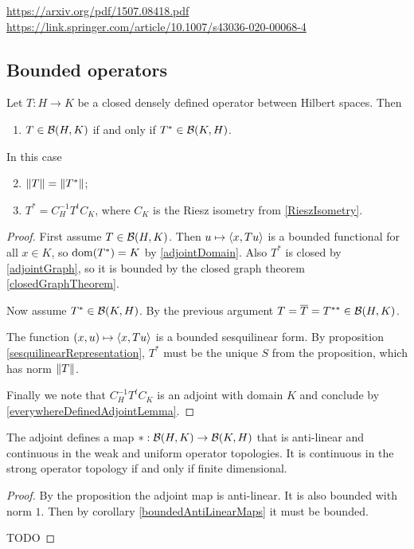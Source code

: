 \url{https://arxiv.org/pdf/1507.08418.pdf}
\url{https://link.springer.com/article/10.1007/s43036-020-00068-4}

\subsection{Bounded operators}
\begin{proposition}
Let $T: H\to K$ be a closed densely defined operator between Hilbert spaces. Then
\begin{enumerate}
\item $T\in\operatorname{\mathcal{B}}(H,K)$ \textup{if and only if} $T^*\in\operatorname{\mathcal{B}}(K,H)$.
\end{enumerate}
In this case
\begin{enumerate} \setcounter{enumi}{1}
\item $\lVert T\rVert = \lVert T^*\rVert$;
\item $T^* = C_H^{-1}T^tC_K$, where $C_K$ is the Riesz isometry from \ref{RieszIsometry}.
\end{enumerate}
\end{proposition}
\begin{proof}
First assume $T\in\operatorname{\mathcal{B}}(H,K)$. Then $u\mapsto \left\langle x,Tu \right\rangle$ is a bounded functional for all $x\in K$, so $\operatorname{dom}(T^*) = K$ by \ref{adjointDomain}. Also $T^*$ is closed by \ref{adjointGraph}, so it is bounded by the closed graph theorem \ref{closedGraphTheorem}.

Now assume $T^*\in\operatorname{\mathcal{B}}(K,H)$. By the previous argument $T = \overline{T} = T^{**}\in\operatorname{\mathcal{B}}(H,K)$.

The function $(x,u)\mapsto \left\langle x,Tu \right\rangle$ is a bounded sesquilinear form. By proposition \ref{sesquilinearRepresentation}, $T^*$ must be the unique $S$ from the proposition, which has norm $\lVert T\rVert$.

Finally we note that $C_H^{-1}T^tC_K$ is an adjoint with domain $K$ and conclude by \ref{everywhereDefinedAdjointLemma}.
\end{proof}

\begin{lemma}
The adjoint defines a map $*:\operatorname{\mathcal{B}}(H,K)\to \operatorname{\mathcal{B}}(K,H)$ that is anti-linear and continuous in the weak and uniform operator topologies. It is continuous in the strong operator topology \textup{if and only if} finite dimensional.
\end{lemma}
\begin{proof}
By the proposition the adjoint map is anti-linear. It is also bounded with norm $1$. Then by corollary \ref{boundedAntiLinearMaps} it must be bounded.

TODO
\end{proof}

